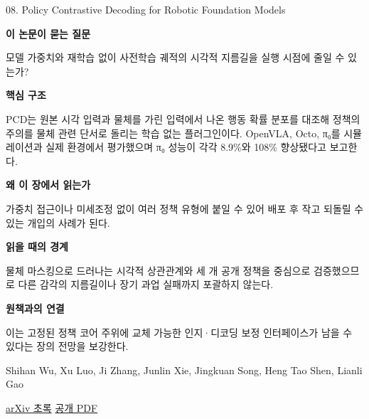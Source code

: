 \documentclass[11pt,openany]{book}
\begin{document}
\begin{termcard}{08. Policy Contrastive Decoding for Robotic Foundation Models}

\par

\medskip

{\sffamily\bfseries\color{deepblue} 이 논문이 묻는 질문}\par

모델 가중치와 재학습 없이 사전학습 궤적의 시각적 지름길을 실행 시점에 줄일 수 있는가?

\smallskip

{\sffamily\bfseries\color{deepblue} 핵심 구조}\par

PCD는 원본 시각 입력과 물체를 가린 입력에서 나온 행동 확률 분포를 대조해 정책의 주의를 물체 관련 단서로 돌리는 학습 없는 플러그인이다. OpenVLA, Octo, π₀를 시뮬레이션과 실제 환경에서 평가했으며 π₀ 성능이 각각 8.9\%와 108\% 향상됐다고 보고한다.

\smallskip

{\sffamily\bfseries\color{deepblue} 왜 이 장에서 읽는가}\par

가중치 접근이나 미세조정 없이 여러 정책 유형에 붙일 수 있어 배포 후 작고 되돌릴 수 있는 개입의 사례가 된다.

\smallskip

{\sffamily\bfseries\color{coral} 읽을 때의 경계}\par

물체 마스킹으로 드러나는 시각적 상관관계와 세 개 공개 정책을 중심으로 검증했으므로 다른 감각의 지름길이나 장기 과업 실패까지 포괄하지 않는다.

\smallskip

{\sffamily\bfseries\color{teal} 원책과의 연결}\par

이는 고정된 정책 코어 주위에 교체 가능한 인지·디코딩 보정 인터페이스가 남을 수 있다는 장의 전망을 보강한다.

\medskip

{\footnotesize\color{muted} Shihan Wu, Xu Luo, Ji Zhang, Junlin Xie, Jingkuan Song, Heng Tao Shen, Lianli Gao\par

\href{https://arxiv.org/abs/2505.13255}{arXiv 초록} \quad \href{https://arxiv.org/pdf/2505.13255}{공개 PDF}\par}

\end{termcard}
\end{document}
